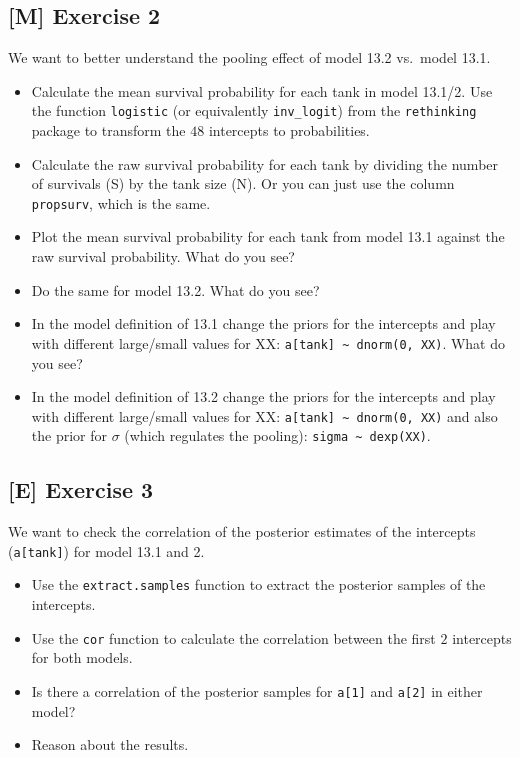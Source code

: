 \documentclass[
]{book}
\providecommand{\tightlist}{%
  \setlength{\itemsep}{0pt}\setlength{\parskip}{0pt}}
\begin{document}
\subsection{{[}M{]} Exercise 2}\label{exercise2_LMM}

We want to better understand the pooling effect of model 13.2 vs.~model 13.1.

\begin{itemize}
\tightlist
\item
  Calculate the mean survival probability for each tank in model 13.1/2. Use the function \texttt{logistic}
  (or equivalently \texttt{inv\_logit}) from the \texttt{rethinking} package to transform the \(48\) intercepts to probabilities.
\item
  Calculate the raw survival probability for each tank by dividing the number of survivals (S) by
  the tank size (N). Or you can just use the column \texttt{propsurv}, which is the same.
\item
  Plot the mean survival probability for each tank from model 13.1 against the raw survival probability.
  What do you see?
\item
  Do the same for model 13.2.
  What do you see?
\item
  In the model definition of 13.1 change the priors for the intercepts and
  play with different large/small values for XX: \texttt{a{[}tank{]}\ \textasciitilde{}\ dnorm(0,\ XX)}.
  What do you see?
\item
  In the model definition of 13.2 change the priors for the intercepts and
  play with different large/small values for XX: \texttt{a{[}tank{]}\ \textasciitilde{}\ dnorm(0,\ XX)} and
  also the prior for \(\sigma\) (which regulates the pooling): \texttt{sigma\ \textasciitilde{}\ dexp(XX)}.
\end{itemize}

\subsection{{[}E{]} Exercise 3}\label{exercise3_LMM}

We want to check the correlation of the posterior estimates of the intercepts (\texttt{a{[}tank{]}}) for model 13.1 and 2.

\begin{itemize}
\tightlist
\item
  Use the \texttt{extract.samples} function to extract the posterior samples of the intercepts.
\item
  Use the \texttt{cor} function to calculate the correlation between the first \(2\) intercepts for both models.
\item
  Is there a correlation of the posterior samples for \texttt{a{[}1{]}} and \texttt{a{[}2{]}} in either model?
\item
  Reason about the results.
\end{itemize}
\end{document}
